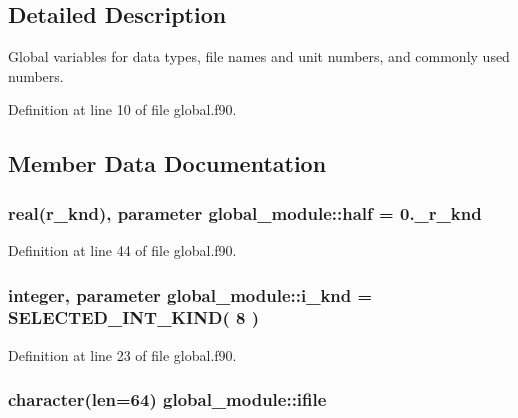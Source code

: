 \subsection{Detailed Description}
Global variables for data types, file names and unit numbers, and commonly used numbers. 

Definition at line 10 of file global.\-f90.



\subsection{Member Data Documentation}
\hypertarget{classglobal__module_aca3045154e42c1413c7e40cff43d609b}{
\subsubsection[{half}]{\setlength{\rightskip}{0pt plus 5cm}real({\bf r\-\_\-knd}), parameter global\-\_\-module\-::half = 0.\-\_\-r\-\_\-knd}}\label{classglobal__module_aca3045154e42c1413c7e40cff43d609b}


Definition at line 44 of file global.\-f90.

\hypertarget{classglobal__module_a01b861666154d8b3e5bd725ae8933438}{
\subsubsection[{i\-\_\-knd}]{\setlength{\rightskip}{0pt plus 5cm}integer, parameter global\-\_\-module\-::i\-\_\-knd = S\-E\-L\-E\-C\-T\-E\-D\-\_\-\-I\-N\-T\-\_\-\-K\-I\-N\-D( 8 )}}\label{classglobal__module_a01b861666154d8b3e5bd725ae8933438}


Definition at line 23 of file global.\-f90.

\hypertarget{classglobal__module_a1da218815b0b537a80f4792dfb22db36}{
\subsubsection[{ifile}]{\setlength{\rightskip}{0pt plus 5cm}character(len=64) global\-\_\-module\-::ifile}}\label{classglobal__module_a1da218815b0b537a80f4792dfb22db36}


